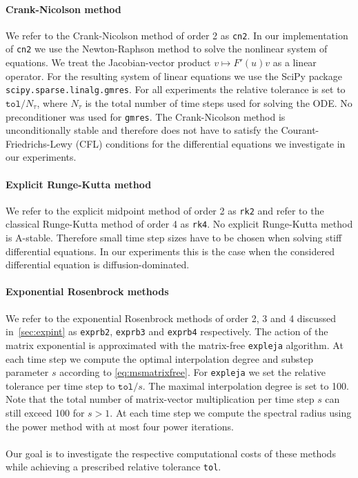 \documentclass{scrartcl}
\begin{document}
	\paragraph{Crank-Nicolson method}
	We refer to the Crank-Nicolson method of order 2 as \texttt{cn2}.
	In our implementation of \texttt{cn2} we use the Newton-Raphson method to solve the nonlinear system of equations. We treat the Jacobian-vector product $v\mapsto F'(u)v$ as a linear operator. For the resulting system of linear equations we use the SciPy package \texttt{scipy.sparse.linalg.gmres}. For all experiments the relative tolerance is set to $\texttt{tol}/N_\tau$, where $N_\tau$ is the total number of time steps used for solving the ODE. No preconditioner was used for \texttt{gmres}. The Crank-Nicolson method is unconditionally stable and therefore does not have to satisfy the Courant-Friedrichs-Lewy (CFL) conditions for the differential equations we investigate in our experiments.
	
	\paragraph{Explicit Runge-Kutta method}
	We refer to the explicit midpoint method of order 2 as \texttt{rk2} and refer to the classical Runge-Kutta method of order 4 as \texttt{rk4}. No explicit Runge-Kutta method is A-stable. Therefore small time step sizes have to be chosen when solving stiff differential equations. In our experiments this is the case when the considered differential equation is diffusion-dominated.
	
	\paragraph{Exponential Rosenbrock methods}
	We refer to the exponential Rosenbrock methods of order 2, 3 and 4 discussed in~\ref{sec:expint} as \texttt{exprb2}, \texttt{exprb3} and \texttt{exprb4} respectively.
	The action of the matrix exponential is approximated with the matrix-free \texttt{expleja} algorithm. At each time step we compute the optimal interpolation degree and substep parameter $s$ according to \eqref{eq:msmatrixfree}. For \texttt{expleja} we set the relative tolerance per time step to $\texttt{tol}/s$.
	The maximal interpolation degree is set to 100. Note that the total number of matrix-vector multiplication per time step $s$ can still exceed 100 for $s>1$. At each time step we compute the spectral radius using the power method with at most four power iterations.\\
	\\
	Our goal is to investigate the respective computational costs of these methods while achieving a prescribed relative tolerance \texttt{tol}.
	
\end{document}
